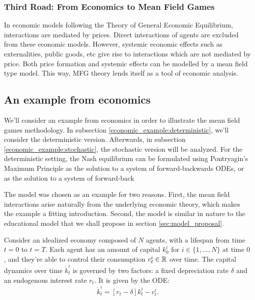 \documentclass{article}
\begin{document}
\subsubsection{Third Road: From Economics to Mean Field Games}
In economic models following the Theory of General Economic Equilibrium, interactions are mediated by prices. Direct interactions of agents are excluded from these economic models. However, systemic economic effects such as externalities, public goods, etc give rise to interactions which are not mediated by price. Both price formation and systemic effects can be modelled by a mean field type model. This way, MFG theory lends itself as a tool of economic analysis.


\subsection{An example from economics}
\color{blue}

We'll consider an example from economics in order to illustrate the mean field games methodology.
In subsection \ref{economic_example:deterministic}, we'll consider the deterministic version.
Afterwards, in subsection \ref{economic_example:stochastic}, the stochastic version will be analyzed.
For the deterministic setting, the Nash equilibrium can be formulated using Pontryagin's Maximum Principle 
as the solution to a system of forward-backwards ODEs,
or as the solution to a system of forward-back

The model was chosen as an example for two reasons.
First, the mean field interactions arise naturally from the underlying economic theory, which makes the example a fitting introduction.
Second, the model is similar in nature to the educational model that we shall propose in section \ref{sec:model_proposal}.


Consider an idealized economy composed of $N$ agents, with a lifespan from time $t = 0$ to $t = T$.
Each agent has an amount of capital $k_0^i$ for $i \in \{1,...,N\}$ at time $0$, and they're able to control their consumption $c_t^i \in \mathbb{R}$ over time.
The capital dynamics over time $\dot k_t^i$ is governed by two factors:
a fixed depreciation rate $\delta$ and an endogenous interest rate $r_t$. It is given by the ODE:
\begin{equation}
    \dot k_t^i = \left[r_t - \delta \right] k_t^i - c_t^i. 
\end{equation}
\end{document}
